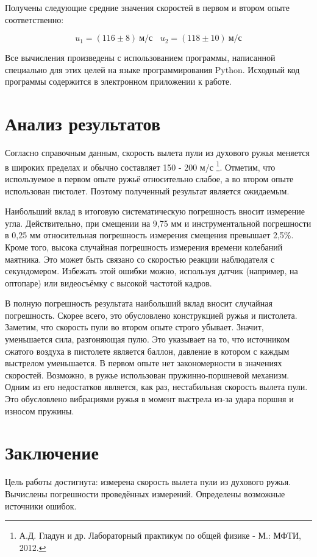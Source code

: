 \documentclass{article}
\begin{document}
Получены следующие средние значения скоростей в первом и втором опыте соответственно:

\begin{equation}
	\boxed{ u_1 = (116 \pm 8) \ м/с \ \ \ \ u_2 = (118 \pm 10) \ м/с}
\end{equation}

Все вычисления произведены с использованием программы, написанной специально для этих целей на языке программирования Python. Исходный код программы содержится в электронном приложении к работе.




 

\section*{Анализ результатов}

\hspace{4mm} Согласно справочным данным, скорость вылета пули из духового ружья меняется в широких пределах и обычно составляет 150 - 200 м/с \footnote[1]{А.Д. Гладун и др. Лабораторный практикум по общей физике - М.: МФТИ, 2012.}. Отметим, что используемое в первом опыте ружьё относительно слабое, а во втором опыте использован пистолет. Поэтому полученный результат является ожидаемым. 

Наибольший вклад в итоговую систематическую погрешность вносит измерение угла. Действительно, при смещении на 9,75 мм и инструментальной погрешности в 0,25 мм относительная погрешность измерения смещения превышает 2,5\%. Кроме того, высока случайная погрешность измерения времени колебаний маятника. Это может быть связано со скоростью реакции наблюдателя с секундомером. Избежать этой ошибки можно, используя датчик (например, на оптопаре) или видеосъёмку с высокой частотой кадров.

В полную погрешность результата наибольший вклад вносит случайная погрешность. Скорее всего, это обусловлено конструкцией ружья и пистолета. Заметим, что скорость пули во втором опыте строго убывает. Значит, уменьшается сила, разгоняющая пулю. Это указывает на то, что источником сжатого воздуха в пистолете является баллон, давление в котором с каждым выстрелом уменьшается. В первом опыте нет закономерности в значениях скоростей. Возможно, в ружье использован пружинно-поршневой механизм. Одним из его недостатков является, как раз, нестабильная скорость вылета пули. Это обусловлено вибрациями ружья в момент выстрела из-за удара поршня и износом пружины.  


\section*{Заключение}
\hspace{4mm} Цель работы достигнута: измерена скорость вылета пули из духового ружья. Вычислены погрешности проведённых измерений. Определены возможные источники ошибок.
\end{document}
